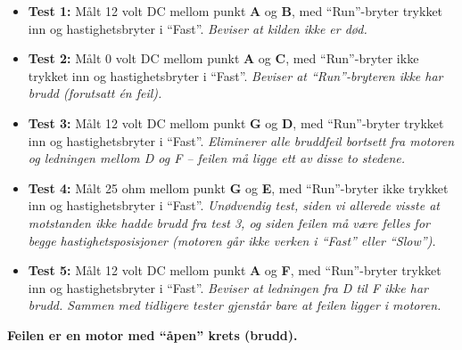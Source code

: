 \begin{itemize}
\item{} {\bf Test 1:} Målt 12 volt DC mellom punkt {\bf A} og {\bf B}, med ``Run''-bryter trykket inn og hastighetsbryter i ``Fast''.  {\it Beviser at kilden ikke er død.}
\vskip 5pt
\item{} {\bf Test 2:} Målt 0 volt DC mellom punkt {\bf A} og {\bf C}, med ``Run''-bryter ikke trykket inn og hastighetsbryter i ``Fast''.  {\it Beviser at ``Run''-bryteren ikke har brudd (forutsatt én feil).}
\vskip 5pt
\item{} {\bf Test 3:} Målt 12 volt DC mellom punkt {\bf G} og {\bf D}, med ``Run''-bryter trykket inn og hastighetsbryter i ``Fast''.  {\it Eliminerer alle bruddfeil bortsett fra motoren og ledningen mellom D og F -- feilen må ligge ett av disse to stedene.}
\vskip 5pt
\item{} {\bf Test 4:} Målt 25 ohm mellom punkt {\bf G} og {\bf E}, med ``Run''-bryter ikke trykket inn og hastighetsbryter i ``Fast''.  {\it Unødvendig test, siden vi allerede visste at motstanden ikke hadde brudd fra test 3, og siden feilen må være felles for begge hastighetsposisjoner (motoren går ikke verken i ``Fast'' eller ``Slow'').} 
\vskip 5pt
\item{} {\bf Test 5:} Målt 12 volt DC mellom punkt {\bf A} og {\bf F}, med ``Run''-bryter trykket inn og hastighetsbryter i ``Fast''.  {\it Beviser at ledningen fra D til F ikke har brudd.  Sammen med tidligere tester gjenstår bare at feilen ligger i motoren.}
\end{itemize}

\vskip 10pt

{\bf Feilen er en motor med ``åpen'' krets (brudd).}










